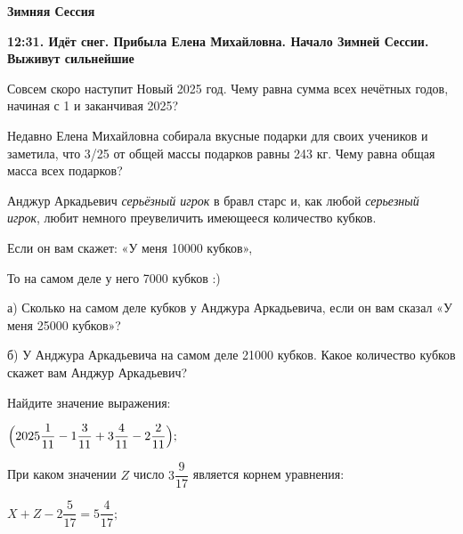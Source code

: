 \centerline{\bf \Huge Зимняя Сессия}
\centerline{\bf \Huge }

\begin{flushright}
        \scriptsize{\textbf{12:31. Идёт снег. Прибыла Елена Михайловна. Начало Зимней Сессии. Выживут сильнейшие}}
\end{flushright}


 Совсем скоро наступит Новый 2025 год. Чему равна сумма всех нечётных годов, начиная с 1 и заканчивая 2025?

 Недавно Елена Михайловна собирала вкусные подарки для своих учеников и заметила, что 3/25 от общей массы подарков равны 243 кг. Чему равна общая масса всех подарков?

 Анджур Аркадьевич \textit{серьёзный игрок} в бравл старс и, как любой \textit{серьезный игрок}, любит немного преувеличить имеющееся количество кубков. 

Если он вам скажет: «У меня 10000 кубков»,

То на самом деле у него 7000 кубков :)

а) Сколько на самом деле кубков у Анджура Аркадьевича, если он вам сказал «У меня 25000 кубков»?

б) У Анджура Аркадьевича на самом деле 21000 кубков. Какое количество кубков скажет вам Анджур Аркадьевич? 

 Найдите значение выражения:

$\Bigr(2025\dfrac{1}{11} - 1\dfrac{3}{11} + 3\dfrac{4}{11} - 2\dfrac{2}{11}\Bigl);$

 При каком значении $Z$ число $3\dfrac{9}{17}$ является корнем уравнения:

$X + Z - 2\dfrac{5}{17} = 5\dfrac{4}{17};$
